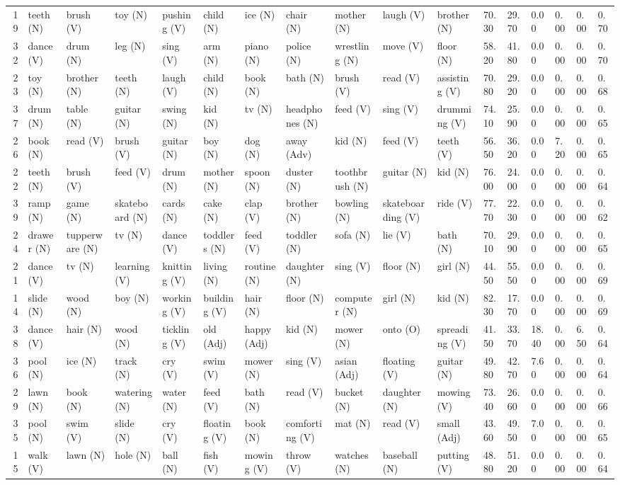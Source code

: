 \begin{tabular}{rllllllllllllllll}
19 & teeth (N) & brush (V) & toy (N) & pushing (V) & child (N) & ice (N) & chair (N) & mother (N) & laugh (V) & brother (N) & 70.30 & 29.70 & 0.00 & 0.00 & 0.00 & 0.70 \\
32 & dance (V) & drum (N) & leg (N) & sing (V) & arm (N) & piano (N) & police (N) & wrestling (N) & move (V) & floor (N) & 58.20 & 41.80 & 0.00 & 0.00 & 0.00 & 0.70 \\
23 & toy (N) & brother (N) & teeth (N) & laugh (V) & child (N) & book (N) & bath (N) & brush (V) & read (V) & assisting (V) & 70.80 & 29.20 & 0.00 & 0.00 & 0.00 & 0.68 \\
37 & drum (N) & table (N) & guitar (N) & swing (N) & kid (N) & tv (N) & headphones (N) & feed (V) & sing (V) & drumming (V) & 74.10 & 25.90 & 0.00 & 0.00 & 0.00 & 0.65 \\
26 & book (N) & read (V) & brush (V) & guitar (N) & boy (N) & dog (N) & away (Adv) & kid (N) & feed (V) & teeth (V) & 56.50 & 36.20 & 0.00 & 7.20 & 0.00 & 0.65 \\
22 & teeth (N) & brush (V) & feed (V) & drum (N) & mother (N) & spoon (N) & duster (N) & toothbrush (N) & guitar (N) & kid (N) & 76.00 & 24.00 & 0.00 & 0.00 & 0.00 & 0.64 \\
39 & ramp (N) & game (N) & skateboard (N) & cards (N) & cake (N) & clap (V) & brother (N) & bowling (N) & skateboarding (V) & ride (V) & 77.70 & 22.30 & 0.00 & 0.00 & 0.00 & 0.62 \\
24 & drawer (N) & tupperware (N) & tv (N) & dance (V) & toddlers (N) & feed (V) & toddler (N) & sofa (N) & lie (V) & bath (N) & 70.10 & 29.90 & 0.00 & 0.00 & 0.00 & 0.65 \\
21 & dance (V) & tv (N) & learning (V) & knitting (V) & living (N) & routine (N) & daughter (N) & sing (V) & floor (N) & girl (N) & 44.50 & 55.50 & 0.00 & 0.00 & 0.00 & 0.69 \\
14 & slide (N) & wood (N) & boy (N) & working (V) & building (V) & hair (N) & floor (N) & computer (N) & girl (N) & kid (N) & 82.30 & 17.70 & 0.00 & 0.00 & 0.00 & 0.69 \\
38 & dance (V) & hair (N) & wood (N) & tickling (V) & old (Adj) & happy (Adj) & kid (N) & mower (N) & onto (O) & spreading (V) & 41.50 & 33.70 & 18.40 & 0.00 & 6.50 & 0.64 \\
36 & pool (N) & ice (N) & track (N) & cry (V) & swim (V) & mower (N) & sing (V) & asian (Adj) & floating (V) & guitar (N) & 49.80 & 42.70 & 7.60 & 0.00 & 0.00 & 0.64 \\
29 & lawn (N) & book (N) & watering (N) & water (N) & feed (V) & bath (N) & read (V) & bucket (N) & daughter (N) & mowing (V) & 73.40 & 26.60 & 0.00 & 0.00 & 0.00 & 0.66 \\
35 & pool (N) & swim (V) & slide (N) & cry (V) & floating (V) & book (N) & comforting (V) & mat (N) & read (V) & small (Adj) & 43.60 & 49.50 & 7.00 & 0.00 & 0.00 & 0.65 \\
15 & walk (V) & lawn (N) & hole (N) & ball (N) & fish (V) & mowing (V) & throw (V) & watches (N) & baseball (N) & putting (V) & 48.80 & 51.20 & 0.00 & 0.00 & 0.00 & 0.64 \\
\bottomrule
\end{tabular}
